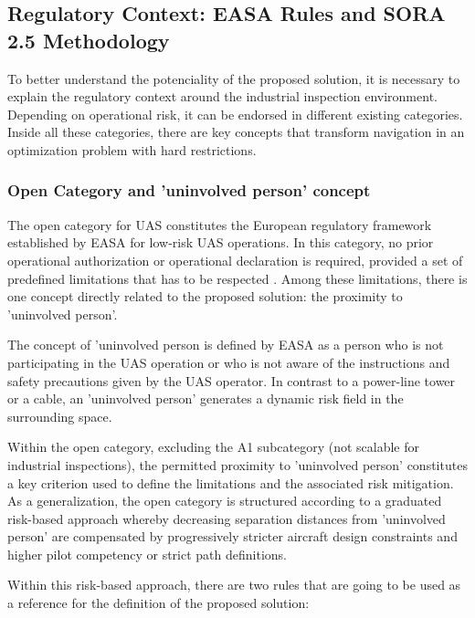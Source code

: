 \documentclass[a4paper, 11pt]{article}
\begin{document}
\subsection{Regulatory Context: EASA Rules and SORA 2.5 Methodology}

To better understand the potenciality of the proposed solution, it is necessary to explain the regulatory context around the industrial inspection environment. Depending on operational risk, it can be endorsed in different existing categories. Inside all these categories, there are key concepts that transform navigation in an optimization problem with hard restrictions. 

\subsubsection{Open Category and 'uninvolved person' concept }

The open category for UAS constitutes the European regulatory framework established by EASA for low-risk UAS operations. In this category, no prior operational authorization or operational declaration is required, provided a set of predefined limitations that has to be respected \cite{EU2019_947}. Among these limitations, there is one concept directly related to the proposed solution: the proximity to 'uninvolved person'. 

The concept of 'uninvolved person is defined by EASA as a person who is not participating in the UAS operation or who is not aware of the instructions and safety precautions given by the UAS operator. In contrast to a power-line tower or a cable, an 'uninvolved person' generates a dynamic risk field in the surrounding space. 

Within the open category, excluding the A1 subcategory (not scalable for industrial inspections), the permitted proximity to 'uninvolved person' constitutes a key criterion used to define the limitations and the associated risk mitigation. As a generalization, the open category is structured according to a graduated risk-based approach whereby decreasing separation distances from 'uninvolved person' are compensated by progressively stricter aircraft design constraints and higher pilot competency or strict path definitions. 

Within this risk-based approach, there are two rules that are going to be used as a reference for the definition of the proposed solution: 
\end{document}
